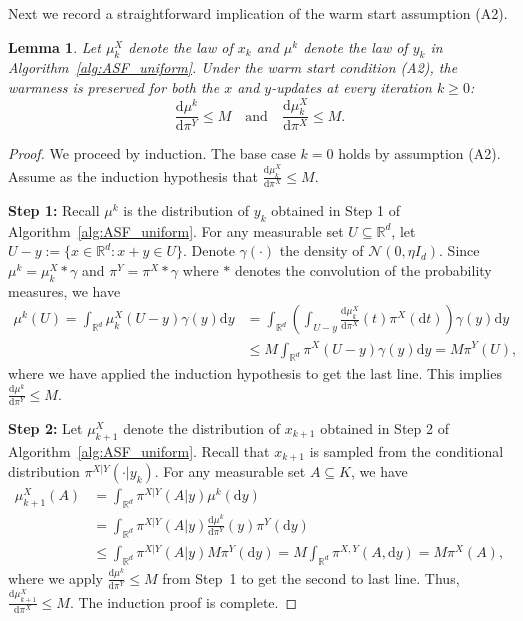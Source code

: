 \documentclass[11pt,letterpaper]{article}
\newcommand{\R}{\mathbb{R}}
\newcommand{\D}{\mathrm{d}}
\newtheorem{lemma}[thm]{Lemma}
\begin{document}
Next we record a straightforward implication of the warm start assumption (A2). 
\begin{lemma}
\label{lem:warmstart}
Let $\mu^X_k$ denote the law of $x_k$ and $\mu^k$ denote the law of $y_k$ in Algorithm~\ref{alg:ASF_uniform}.
Under the warm start condition (A2), the warmness is preserved for both the $x$ and $y$-updates at every iteration $k\geq 0$:
\[\frac{\D \mu^k}{\D \pi^Y}\leq M \quad\text{and}\quad \frac{\D \mu^X_k}{\D \pi^X} \leq M. \]
\end{lemma}
\begin{proof}
We proceed by induction. The base case $k=0$ holds by assumption (A2).
Assume as the induction hypothesis that $\frac{\D \mu^X_k}{\D \pi^X} \leq M$.

\textbf{Step 1:}
Recall $\mu^k$ is the distribution of $y_k$ obtained in Step 1 of Algorithm~\ref{alg:ASF_uniform}.
For any measurable set $U\subseteq \R^d$, let $U-y:=\{x\in \R^d:x+y\in U \}$. Denote $\gamma(\cdot)$ the density of $\mathcal{N}(0,\eta I_d)$.
Since $\mu^k = \mu^X_k * \gamma$ and $\pi^Y = \pi^X * \gamma$ where $*$ denotes the convolution of the probability measures, we have
\begin{align*}
    \mu^k(U)= \int_{\R^d} \mu^X_k(U-y) \gamma(y)\D y&=\int_{\R^d} \left(\int_{U-y} \frac{\D \mu^X_k}{\D \pi^X}(t) \pi^X(\D  t) \right) \gamma(y) \D y\\
    &\leq M\int_{\R^d} \pi^X(U-y)\gamma(y) \D y = M\pi^Y(U),
\end{align*}
where we have applied the induction hypothesis to get the last line. This implies $\frac{\D \mu^k}{\D \pi^Y} \leq M$. 

\textbf{Step 2:}
Let $\mu^X_{k+1}$ denote the distribution of $x_{k+1}$ obtained in Step 2 of Algorithm~\ref{alg:ASF_uniform}.
Recall that $x_{k+1}$ is sampled from the conditional distribution $\pi^{X|Y}(\cdot|y_k)$.
For any measurable set $A \subseteq K$, we have
\begin{align*}
\mu^X_{k+1}(A) &= \int_{\R^d} \pi^{X|Y}(A|y)  \mu^k(\D y) \\
&= \int_{\R^d} \pi^{X|Y}(A|y) \frac{\D \mu^k}{\D \pi^Y}(y)  \pi^Y(\D y ) \\
&\leq \int_{\R^d} \pi^{X|Y}(A|y) M  \pi^Y(\D y) = M \int_{\R^d} \pi^{X,Y}(A , \D y) = M \pi^X(A), 
\end{align*}
where we apply $\frac{\D \mu^k}{\D \pi^Y} \leq M$ from Step~1 to get the second to last line. Thus, $\frac{\D \mu^X_{k+1}}{\D \pi^X} \leq M$. The induction proof is complete. 
\end{proof}
\end{document}
